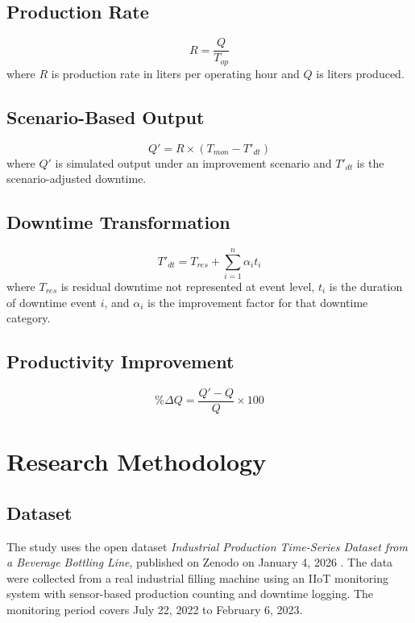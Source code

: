 \documentclass[journal]{IEEEtran}
\begin{document}
\subsection{Production Rate}
\begin{equation}
R = \frac{Q}{T_{op}}
\end{equation}
where $R$ is production rate in liters per operating hour and $Q$ is liters produced.

\subsection{Scenario-Based Output}
\begin{equation}
Q' = R \times (T_{mon} - T'_{dt})
\end{equation}
where $Q'$ is simulated output under an improvement scenario and $T'_{dt}$ is the scenario-adjusted downtime.

\subsection{Downtime Transformation}
\begin{equation}
T'_{dt} = T_{res} + \sum_{i=1}^{n}\alpha_i t_i
\end{equation}
where $T_{res}$ is residual downtime not represented at event level, $t_i$ is the duration of downtime event $i$, and $\alpha_i$ is the improvement factor for that downtime category.

\subsection{Productivity Improvement}
\begin{equation}
\%\Delta Q = \frac{Q' - Q}{Q}\times 100
\end{equation}

\section{Research Methodology}
\subsection{Dataset}
The study uses the open dataset \emph{Industrial Production Time-Series Dataset from a Beverage Bottling Line}, published on Zenodo on January 4, 2026 \cite{david2026dataset}. The data were collected from a real industrial filling machine using an IIoT monitoring system with sensor-based production counting and downtime logging. The monitoring period covers July 22, 2022 to February 6, 2023.
\end{document}
